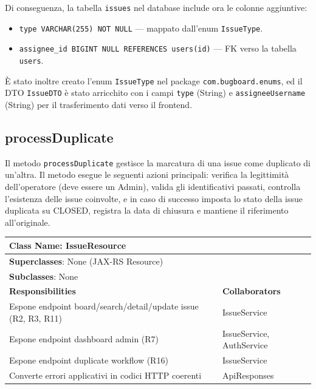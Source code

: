 ﻿\documentclass[11pt,a4paper]{article}
\begin{document}
\noindent Di conseguenza, la tabella \texttt{issues} nel database include ora le colonne aggiuntive:
\begin{itemize}
    \item \texttt{type VARCHAR(255) NOT NULL} --- mappato dall'enum \texttt{IssueType}.
    \item \texttt{assignee\_id BIGINT NULL REFERENCES users(id)} --- FK verso la tabella \texttt{users}.
\end{itemize}

\noindent È stato inoltre creato l'enum \texttt{IssueType} nel package \texttt{com.bugboard.enums}, ed il DTO \texttt{IssueDTO} è stato arricchito con i campi \texttt{type} (String) e \texttt{assigneeUsername} (String) per il trasferimento dati verso il frontend.

\subsection{processDuplicate}
Il metodo \texttt{processDuplicate} gestisce la marcatura di una issue come duplicato di un'altra. Il metodo esegue le seguenti azioni principali: verifica la legittimità dell'operatore (deve essere un Admin), valida gli identificativi passati, controlla l'esistenza delle issue coinvolte, e in caso di successo imposta lo stato della issue duplicata su CLOSED, registra la data di chiusura e mantiene il riferimento all'originale.

\begin{tabularx}{\textwidth}{|X|X|}
    \hline
    \multicolumn{2}{|l|}{\textbf{Class Name}: IssueResource}                          \\ \hline
    \multicolumn{2}{|l|}{\textbf{Superclasses}: None (JAX-RS Resource)}               \\ \hline
    \multicolumn{2}{|l|}{\textbf{Subclasses}: None}                                    \\ \hline
    \textbf{Responsibilities}                                 & \textbf{Collaborators} \\ \hline
    Espone endpoint board/search/detail/update issue (R2, R3, R11) & IssueService      \\ \hline
    Espone endpoint dashboard admin (R7)                      & IssueService, AuthService \\ \hline
    Espone endpoint duplicate workflow (R16)                  & IssueService        \\ \hline
    Converte errori applicativi in codici HTTP coerenti       & ApiResponses        \\ \hline
\end{tabularx}
\end{document}
